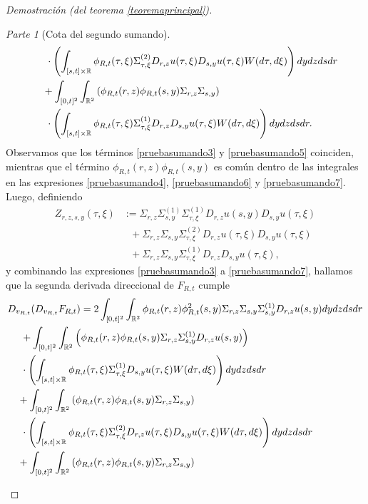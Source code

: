 \documentclass[letterpaper,twoside,12pt]{book}
\newcommand{\R}{\mathbb{R}}
\newcommand{\1}{\mathds{1}}
\theoremstyle{definition}
\theoremstyle{definition}
\theoremstyle{remark}
\newtheorem{proofpart}{Parte}
\theoremstyle{definition}
\theoremstyle{definition}
\theoremstyle{definition}
\theoremstyle{definition}
\theoremstyle{definition}
\begin{document}
\begin{proof}[Demostración (del teorema \ref{teoremaprincipal})]
\begin{proofpart}[Cota del segundo sumando]
\begin{align}
   &\ \ \ \ \cdot\left(\int_{[s,t]\times \R} \phi_{R,t}(\tau,\xi)\Sigma^{(2)}_{\tau,\xi}D_{r,z}u(\tau,\xi)D_{s,y}u(\tau,\xi)W(d\tau,d\xi)\right) dy dz ds dr\label{pruebasumando6}\\
   &\ \ \ +\int_{[0,t]^2}\int_{\R^2}\left(\phi_{R,t}(r,z)\phi_{R,t}(s,y)\Sigma_{r,z}\Sigma_{s,y}\right)\notag\\
   &\ \ \ \ \cdot\left(\int_{[s,t]\times \R}\phi_{R,t}(\tau,\xi)\Sigma^{(1)}_{\tau,\xi}D_{r,z}D_{s,y}u(\tau,\xi)W(d\tau,d\xi)\right) dy dz ds dr.\label{pruebasumando7}
\end{align}
Observamos que los términos \eqref{pruebasumando3} y \eqref{pruebasumando5} coinciden, mientras que el término $\phi_{R,t}(r,z)\phi_{R,t}(s,y)$ es común dentro de las integrales en las expresiones \eqref{pruebasumando4}, \eqref{pruebasumando6} y \eqref{pruebasumando7}. Luego, definiendo 
\begin{align*}
   Z_{r,z,s,y}(\tau,\xi)&:=\Sigma_{r,z}\Sigma_{s,y}^{(1)}\Sigma_{\tau,\xi}^{(1)}D_{r,z}u(s,y)D_{s,y}u(\tau,\xi)\\
   &\ \ \ +\Sigma_{r,z}\Sigma_{s,y}\Sigma_{\tau,\xi}^{(2)}D_{r,z}u(\tau,\xi)D_{s,y}u(\tau,\xi)\\
   &\ \ \ +\Sigma_{r,z}\Sigma_{s,y}\Sigma_{\tau,\xi}^{(1)}D_{r,z}D_{s,y}u(\tau,\xi),
\end{align*}
y combinando las expresiones \eqref{pruebasumando3} a \eqref{pruebasumando7}, hallamos que la segunda derivada direccional de $F_{R,t}$ cumple
\begin{align}
   &D_{v_{R,t}}(D_{v_{R,t}}F_{R,t})=2\int_{[0,t]^2}\int_{\R^2}\phi_{R,t}(r,z)\phi_{R,t}^2(s,y)\Sigma_{r,z}\Sigma_{s,y}\Sigma^{(1)}_{s,y}D_{r,z}u(s,y)dy dz ds dr\notag\\
   &\ \ \ \ + \int _{[0,t]^2}\int_{\R^2}\left(\phi_{R,t}(r,z)\phi_{R,t}(s,y)\Sigma_{r,z}\Sigma_{s,y}^{(1)}D_{r,z}u(s,y)\right)\notag\\
   & \ \ \ \ \cdot \left(\int_{[s,t]\times\R}\phi_{R,t}(\tau,\xi)\Sigma_{\tau,\xi}^{(1)}D_{s,y}u(\tau,\xi)W(d\tau,d\xi)\right)dy dz ds dr\notag\\
   &\ \ \ +\int _{[0,t]^2}\int_{\R^2}\left(\phi_{R,t}(r,z)\phi_{R,t}(s,y)\Sigma_{r,z}\Sigma_{s,y}\right)\notag\\
   &\ \ \ \ \cdot \left(\int_{[s,t]\times\R}\phi_{R,t}(\tau,\xi)\Sigma_{\tau,\xi}^{(2)}D_{r,z}u(\tau,\xi)D_{s,y}u(\tau,\xi)W(d\tau,d\xi)\right)dy dz ds dr\notag\\
   &\ \ \ +\int _{[0,t]^2}\int_{\R^2}\left(\phi_{R,t}(r,z)\phi_{R,t}(s,y)\Sigma_{r,z}\Sigma_{s,y}\right)\notag\\

\end{align}
\end{proofpart}
\end{proof}
\end{document}
